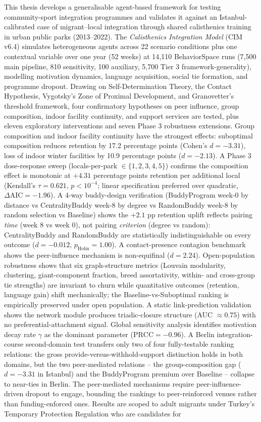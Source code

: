   This thesis develops a generalisable agent-based framework for testing community-sport integration programmes and validates it against an Istanbul-calibrated case of migrant--local integration through shared calisthenics training in urban public parks (2013--2022). The \emph{Calisthenics Integration Model} (CIM v6.4) simulates heterogeneous agents across 22 scenario conditions plus one contextual variable over one year (52 weeks) at 14{,}110 BehaviorSpace runs (7{,}500 main pipeline, 810 sensitivity, 100 auxiliary, 5{,}700 Tier 3 framework-generality), modelling motivation dynamics, language acquisition, social tie formation, and programme dropout. Drawing on Self-Determination Theory, the Contact Hypothesis, Vygotsky's Zone of Proximal Development, and Granovetter's threshold framework, four confirmatory hypotheses on peer influence, group composition, indoor facility continuity, and support services are tested, plus eleven exploratory interventions and seven Phase 3 robustness extensions. Group composition and indoor facility continuity have the strongest effects: suboptimal composition reduces retention by 17.2 percentage points (Cohen's $d = -3.31$), loss of indoor winter facilities by 10.9 percentage points ($d = -2.13$). A Phase 3 dose-response sweep (locals-per-park $\in \{1, 2, 3, 4, 5\}$) confirms the composition effect is monotonic at $+4.31$ percentage points retention per additional local (Kendall's $\tau = 0.621$, $p < 10^{-4}$; linear specification preferred over quadratic, $\Delta\text{AIC} = -1.96$). A 4-way buddy-design verification (BuddyProgram week-0 by distance vs CentralityBuddy week-8 by degree vs RandomBuddy week-8 by random selection vs Baseline) shows the $+2.1$ pp retention uplift reflects pairing \emph{time} (week 8 vs week 0), not pairing \emph{criterion} (degree vs random): CentralityBuddy and RandomBuddy are statistically indistinguishable on every outcome ($d = -0.012$, $p_{\text{Holm}} = 1.00$). A contact-presence contagion benchmark shows the peer-influence mechanism is non-equifinal ($d = 2.24$). Open-population robustness shows that six graph-structure metrics (Louvain modularity, clustering, giant-component fraction, breed assortativity, within- and cross-group tie strengths) are invariant to churn while quantitative outcomes (retention, language gain) shift mechanically; the Baseline-vs-Suboptimal ranking is empirically preserved under open population. A static link-prediction validation shows the network module produces triadic-closure structure (AUC $\approx 0.75$) with no preferential-attachment signal. Global sensitivity analysis identifies motivation decay rate $\gamma$ as the dominant parameter ($\text{PRCC} = -0.96$). A Berlin integration-course second-domain test transfers only two of four fully-testable ranking relations: the gross provide-versus-withhold-support distinction holds in both domains, but the two peer-mediated relations -- the group-composition gap ($d = -3.31$ in Istanbul) and the BuddyProgram premium over Baseline -- collapse to near-ties in Berlin. The peer-mediated mechanisms require peer-influence-driven dropout to engage, bounding the rankings to peer-reinforced venues rather than funding-enforced ones. Results are scoped to adult migrants under Turkey's Temporary Protection Regulation who are candidates for 